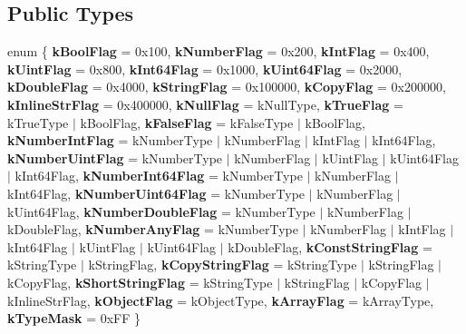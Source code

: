 \subsection*{Public Types}
\begin{DoxyCompactItemize}
\item 
\mbox{\label{classGenericValue_a1fe0c690ebc0feb48dd48b969d0f2f45}} 
enum \{ \newline
{\bfseries k\+Bool\+Flag} = 0x100, 
{\bfseries k\+Number\+Flag} = 0x200, 
{\bfseries k\+Int\+Flag} = 0x400, 
{\bfseries k\+Uint\+Flag} = 0x800, 
\newline
{\bfseries k\+Int64\+Flag} = 0x1000, 
{\bfseries k\+Uint64\+Flag} = 0x2000, 
{\bfseries k\+Double\+Flag} = 0x4000, 
{\bfseries k\+String\+Flag} = 0x100000, 
\newline
{\bfseries k\+Copy\+Flag} = 0x200000, 
{\bfseries k\+Inline\+Str\+Flag} = 0x400000, 
{\bfseries k\+Null\+Flag} = k\+Null\+Type, 
{\bfseries k\+True\+Flag} = k\+True\+Type $\vert$ k\+Bool\+Flag, 
\newline
{\bfseries k\+False\+Flag} = k\+False\+Type $\vert$ k\+Bool\+Flag, 
{\bfseries k\+Number\+Int\+Flag} = k\+Number\+Type $\vert$ k\+Number\+Flag $\vert$ k\+Int\+Flag $\vert$ k\+Int64\+Flag, 
{\bfseries k\+Number\+Uint\+Flag} = k\+Number\+Type $\vert$ k\+Number\+Flag $\vert$ k\+Uint\+Flag $\vert$ k\+Uint64\+Flag $\vert$ k\+Int64\+Flag, 
{\bfseries k\+Number\+Int64\+Flag} = k\+Number\+Type $\vert$ k\+Number\+Flag $\vert$ k\+Int64\+Flag, 
\newline
{\bfseries k\+Number\+Uint64\+Flag} = k\+Number\+Type $\vert$ k\+Number\+Flag $\vert$ k\+Uint64\+Flag, 
{\bfseries k\+Number\+Double\+Flag} = k\+Number\+Type $\vert$ k\+Number\+Flag $\vert$ k\+Double\+Flag, 
{\bfseries k\+Number\+Any\+Flag} = k\+Number\+Type $\vert$ k\+Number\+Flag $\vert$ k\+Int\+Flag $\vert$ k\+Int64\+Flag $\vert$ k\+Uint\+Flag $\vert$ k\+Uint64\+Flag $\vert$ k\+Double\+Flag, 
{\bfseries k\+Const\+String\+Flag} = k\+String\+Type $\vert$ k\+String\+Flag, 
\newline
{\bfseries k\+Copy\+String\+Flag} = k\+String\+Type $\vert$ k\+String\+Flag $\vert$ k\+Copy\+Flag, 
{\bfseries k\+Short\+String\+Flag} = k\+String\+Type $\vert$ k\+String\+Flag $\vert$ k\+Copy\+Flag $\vert$ k\+Inline\+Str\+Flag, 
{\bfseries k\+Object\+Flag} = k\+Object\+Type, 
{\bfseries k\+Array\+Flag} = k\+Array\+Type, 
\newline
{\bfseries k\+Type\+Mask} = 0x\+FF
 \}
\item 

\end{DoxyCompactItemize}
